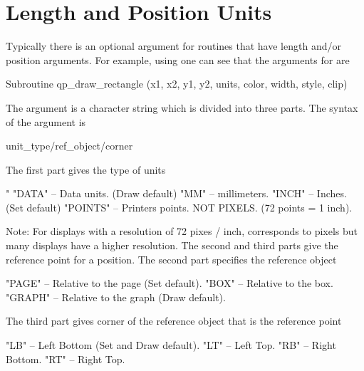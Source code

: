 \section{Length and Position Units}
\label{s:plot.units}

Typically there is an optional  argument for \quickplot routines that
have length and/or position arguments. For example, using  one can
see that the arguments for  are
\begin{example}
  Subroutine qp_draw_rectangle (x1, x2, y1, y2, units, color, width, style, clip)
\end{example}
The  argument is a character string which is divided into three
parts. The syntax of the  argument is
\begin{example}
  unit_type/ref_object/corner
\end{example}
The first part  gives the type of units
\begin{example}
  "%
  "DATA"    -- Data units. (Draw default)
  "MM"      -- millimeters.
  "INCH"    -- Inches. (Set default)
  "POINTS"  -- Printers points. NOT PIXELS. (72 points = 1 inch).
\end{example}
Note: For displays with a resolution of 72 pixes / inch,  corresponds to pixels but
many displays have a higher resolution.
The second and third parts give the reference point for a position.
The second part specifies the reference object
\begin{example}
    "PAGE"  -- Relative to the page (Set default).
    "BOX"   -- Relative to the box.
    "GRAPH" -- Relative to the graph (Draw default).
\end{example}
The third part gives corner of the reference object that is the reference point
\begin{example}
    "LB"    -- Left Bottom (Set and Draw default).
    "LT"    -- Left Top.
    "RB"    -- Right Bottom.
    "RT"    -- Right Top.
\end{example}

